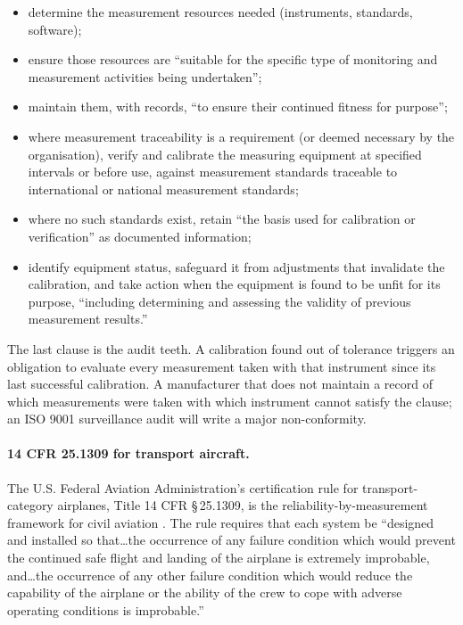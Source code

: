 \begin{itemize}[leftmargin=*]
  \item determine the measurement resources needed (instruments,
    standards, software);
  \item ensure those resources are ``suitable for the specific
    type of monitoring and measurement activities being
    undertaken'';
  \item maintain them, with records, ``to ensure their continued
    fitness for purpose'';
  \item where measurement traceability is a requirement (or
    deemed necessary by the organisation), verify and calibrate
    the measuring equipment at specified intervals or before use,
    against measurement standards traceable to international or
    national measurement standards;
  \item where no such standards exist, retain ``the basis used for
    calibration or verification'' as documented information;
  \item identify equipment status, safeguard it from adjustments
    that invalidate the calibration, and take action when the
    equipment is found to be unfit for its purpose, ``including
    determining and assessing the validity of previous measurement
    results.''
\end{itemize}

The last clause is the audit teeth. A calibration found out of
tolerance triggers an obligation to evaluate every measurement
taken with that instrument since its last successful calibration.
A manufacturer that does not maintain a record of which
measurements were taken with which instrument cannot satisfy the
clause; an ISO 9001 surveillance audit will write a major
non-conformity.

\paragraph{14 CFR 25.1309 for transport aircraft.} The U.S.
Federal Aviation Administration's certification rule for
transport-category airplanes, Title 14 CFR \S\,25.1309, is the
reliability-by-measurement framework for civil aviation
\cite{law:ch01t3b-14cfr25-1309}. The rule requires that each system
be ``designed and installed so that\dots the occurrence of any
failure condition which would prevent the continued safe flight
and landing of the airplane is extremely improbable, and\dots the
occurrence of any other failure condition which would reduce the
capability of the airplane or the ability of the crew to cope with
adverse operating conditions is improbable.''

